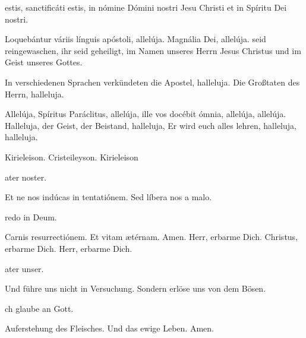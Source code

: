 \documentclass[fontsize=10pt,paper=A5,twoside,BCOR=1mm,DIV=21,headinclude]{scrarticle}
\begin{document}


\vspace{.3em}

\begin{paracol}{2}\pcb 
{} estis, sanctificáti estis, in nómine Dómini nostri Jesu Christi et in Spíritu Dei nostri.

\V Loquebántur váriis línguis apóstoli, allelúja.
\R Magnália Dei, allelúja.
	\switchcolumn
	 seid reingewaschen, ihr seid geheiligt, im Namen unseres Herrn Jesus Christus und im Geist unseres Gottes.

\V In verschiedenen Sprachen verkündeten die Apostel, halleluja.
\R Die Großtaten des Herrn, halleluja.
\end{paracol}


\vspace{.3em}

\begin{paracol}{2}\pcb
\A Allelúja, Spíritus Paráclitus, allelúja, ille vos docébit ómnia, allelúja, allelúja.
	\switchcolumn
	\A Halleluja, der Geist, der Beistand, halleluja, Er wird euch alles lehren, halleluja, halleluja.
\end{paracol}


\begin{paracol}{2} \pcb
\V Kirieleison.
\R Cristeileyson.
\V Kirieleison

ater noster. 

\V Et ne nos indúcas in tentatiónem.
\R Sed líbera nos a malo.

redo in Deum. 

\V Carnis resurrectiónem.
\R Et vitam ætérnam. Amen.
	\switchcolumn
	\V Herr, erbarme Dich. \R Christus, erbarme Dich. \V Herr, erbarme Dich.

	ater unser. 

	\V Und führe uns nicht in Versuchung.
	\R Sondern erlöse uns von dem Bösen.

	ch glaube an Gott. 

	\V Auferstehung des Fleisches.
	\R Und das ewige Leben. Amen.
\end{paracol}
\end{document}
